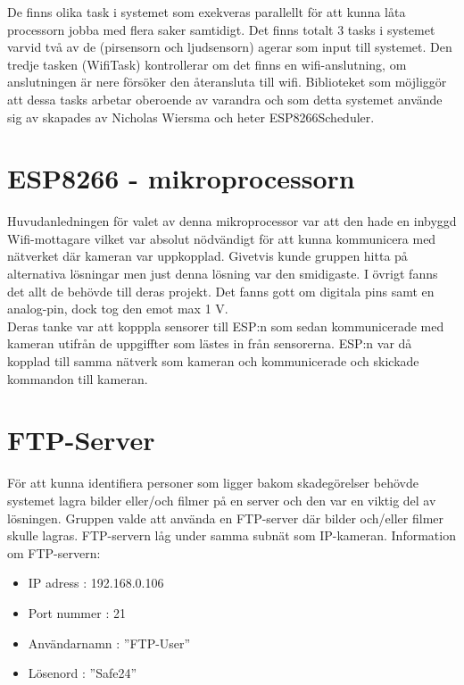 De finns olika task  i systemet som exekveras parallellt för att kunna låta processorn jobba med flera saker samtidigt. Det finns totalt 3 tasks i systemet varvid två av de (pirsensorn och ljudsensorn) agerar som input till systemet. Den tredje tasken (WifiTask) kontrollerar om det finns en wifi-anslutning, om anslutningen är nere försöker den återansluta till wifi.
Biblioteket som möjliggör att dessa tasks arbetar oberoende av varandra och som detta systemet använde sig av skapades av Nicholas Wiersma och heter ESP8266Scheduler. 
\\


\section{ESP8266 - mikroprocessorn}
Huvudanledningen för valet av denna mikroprocessor var att den hade en inbyggd Wifi-mottagare vilket var absolut nödvändigt för att kunna kommunicera med nätverket där kameran var uppkopplad. Givetvis kunde gruppen hitta på alternativa lösningar men just denna lösning var den smidigaste. I övrigt fanns det allt de behövde till deras projekt. Det fanns gott om digitala pins samt en analog-pin, dock tog den emot max 1 V. \\

Deras tanke var att kopppla sensorer till ESP:n som sedan kommunicerade med kameran utifrån de uppgiffter som lästes in från sensorerna. ESP:n var då kopplad till samma nätverk som kameran och kommunicerade och skickade kommandon till kameran.\\
\section{FTP-Server}
För att kunna identifiera personer som ligger bakom skadegörelser behövde systemet lagra bilder eller/och filmer på en server och den var en viktig del av lösningen. Gruppen valde att använda en FTP-server där bilder och/eller filmer skulle lagras. FTP-servern låg under samma subnät som IP-kameran. Information om FTP-servern:

\begin{itemize}
\item IP adress : 192.168.0.106

\item Port nummer : 21

\item Användarnamn : ”FTP-User”

\item Lösenord : ”Safe24”

\end{itemize}
